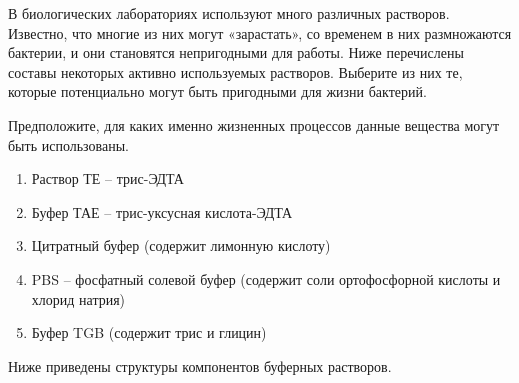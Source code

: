
В биологических лабораториях используют много различных растворов. Известно, что многие из них могут «зарастать», со временем в них размножаются бактерии, и они становятся непригодными для работы. Ниже перечислены составы некоторых активно используемых растворов. Выберите из них те, которые потенциально могут быть пригодными для жизни бактерий. 

Предположите, для каких именно жизненных процессов данные вещества могут быть использованы.

\begin{enumerate}
    \item Раствор ТЕ – трис-ЭДТА
    \item Буфер ТАЕ – трис-уксусная кислота-ЭДТА
    \item Цитратный буфер (содержит лимонную кислоту)
    \item PBS – фосфатный солевой буфер (содержит соли ортофосфорной кислоты и хлорид натрия)
    \item Буфер TGB (содержит трис и глицин)
\end{enumerate}

Ниже приведены структуры компонентов буферных растворов.


